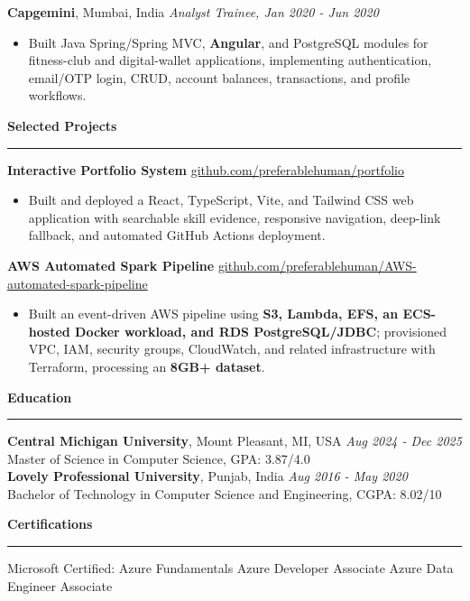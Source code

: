 \documentclass[11pt,letterpaper]{article}
\newcommand{\ressection}[1]{\Needspace{6\baselineskip}\vspace{8pt}\par\textbf{#1}\par\vspace{2pt}\hrule\vspace{5pt}}
\begin{document}
\textbf{Capgemini}, Mumbai, India \hfill \textit{Analyst Trainee, Jan 2020 - Jun 2020}
\begin{itemize}
  \item Built Java Spring/Spring MVC, \textbf{Angular}, and PostgreSQL modules for fitness-club and digital-wallet applications, implementing authentication, email/OTP login, CRUD, account balances, transactions, and profile workflows.
\end{itemize}

\ressection{Selected Projects}
\textbf{Interactive Portfolio System} \hfill \href{https://github.com/preferablehuman/portfolio}{github.com/preferablehuman/portfolio}
\begin{itemize}
  \item Built and deployed a React, TypeScript, Vite, and Tailwind CSS web application with searchable skill evidence, responsive navigation, deep-link fallback, and automated GitHub Actions deployment.
\end{itemize}
\vspace{2pt}
\textbf{AWS Automated Spark Pipeline} \hfill \href{https://github.com/preferablehuman/AWS-automated-spark-pipeline}{github.com/preferablehuman/AWS-automated-spark-pipeline}
\begin{itemize}
  \item Built an event-driven AWS pipeline using \textbf{S3, Lambda, EFS, an ECS-hosted Docker workload, and RDS PostgreSQL/JDBC}; provisioned VPC, IAM, security groups, CloudWatch, and related infrastructure with Terraform, processing an \textbf{8GB+ dataset}.
\end{itemize}

\ressection{Education}
\textbf{Central Michigan University}, Mount Pleasant, MI, USA \hfill \textit{Aug 2024 - Dec 2025}\\
Master of Science in Computer Science, GPA: 3.87/4.0\\[2pt]
\textbf{Lovely Professional University}, Punjab, India \hfill \textit{Aug 2016 - May 2020}\\
Bachelor of Technology in Computer Science and Engineering, CGPA: 8.02/10

\ressection{Certifications}
Microsoft Certified: Azure Fundamentals \textbar{} Azure Developer Associate \textbar{} Azure Data Engineer Associate
\end{document}
